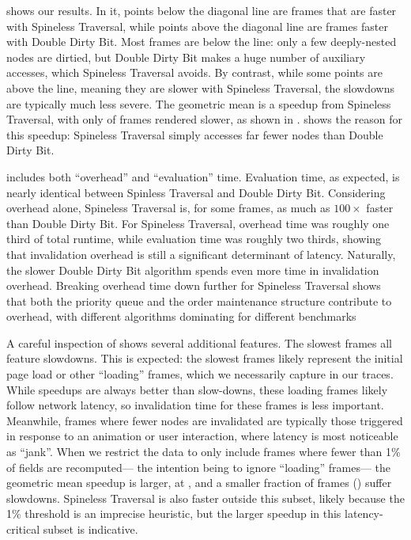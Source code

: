   shows our results.
In it, points below the diagonal line
  are frames that are faster with Spineless Traversal,
  while points above the diagonal line
  are frames faster with Double Dirty Bit.
Most frames are below the line:
  only a few deeply-nested nodes are dirtied,
  but Double Dirty Bit makes a huge number of auxiliary accesses,
  which Spineless Traversal avoids.
By contrast, while some points are above the line,
  meaning they are slower with Spineless Traversal,
  the slowdowns are typically much less severe.
The geometric mean is a \MeanSpeedup speedup
  from Spineless Traversal,
  with only \PctSlower of frames rendered slower,
  as shown in .
 shows the reason for this speedup:
  Spineless Traversal simply accesses far fewer nodes
  than Double Dirty Bit.

 includes both
  ``overhead'' and ``evaluation'' time.
Evaluation time, as expected, is nearly identical
  between Spinless Traversal and Double Dirty Bit.
Considering overhead alone,
  Spineless Traversal is, for some frames,
  as much as $100\times$ faster than Double Dirty Bit.
For Spineless Traversal,
  overhead time was roughly one third of total runtime,
  while evaluation time was roughly two thirds,
  showing that invalidation overhead is still
  a significant determinant of latency.
Naturally, the slower Double Dirty Bit algorithm
  spends even more time in invalidation overhead.
Breaking overhead time down further for Spineless Traversal
  shows that both the priority queue
  and the order maintenance structure
  contribute to overhead, with different algorithms
  dominating for different benchmarks

A careful inspection of  shows
  several additional features.
The slowest frames all feature slowdowns.
This is expected: the slowest frames likely represent
  the initial page load or other ``loading'' frames,
  which we necessarily capture in our traces.
While speedups are always better than slow-downs,
  these loading frames likely follow network latency,
  so invalidation time for these frames is less important.
Meanwhile, frames where fewer nodes are invalidated
  are typically those triggered in response to
  an animation or user interaction,
  where latency is most noticeable as ``jank''.
When we restrict the data to only include frames
  where fewer than 1\% of fields are recomputed---%
  the intention being to ignore ``loading'' frames---%
  the geometric mean speedup is larger,
  at \MeanSpeedupSmall,
  and a smaller fraction of frames (\PctSlowerSmall) suffer slowdowns.
Spineless Traversal is also faster outside this subset,
  likely because the 1\% threshold is an imprecise heuristic,
  but the larger speedup 
  in this latency-critical subset is indicative.

